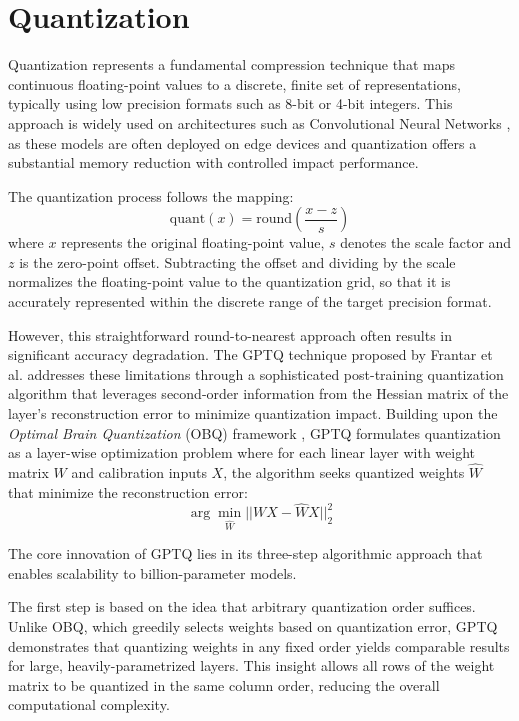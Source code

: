 \section{Quantization} \label{quantization}

Quantization represents a fundamental compression technique that maps continuous floating-point values to a discrete, finite set of representations, typically using low precision formats such as 8-bit or 4-bit integers. This approach is widely used on architectures such as Convolutional Neural Networks \cite{quant_cnn}, as these models are often deployed on edge devices and quantization offers a substantial memory reduction with controlled impact performance.

The quantization process follows the mapping:
\begin{equation}
\text{quant}(x) = \text{round}\left(\frac{x - z}{s}\right)
\end{equation}
where $x$ represents the original floating-point value, $s$ denotes the scale factor and $z$ is the zero-point offset. Subtracting the offset and dividing by the scale normalizes the floating-point value to the quantization grid, so that it is accurately represented within the discrete range of the target precision format.

However, this straightforward round-to-nearest approach often results in significant accuracy degradation. The GPTQ technique proposed by Frantar et al. \cite{gptq_quantization} addresses these limitations through a sophisticated post-training quantization algorithm that leverages second-order information from the Hessian matrix of the layer's reconstruction error to minimize quantization impact. Building upon the \textit{Optimal Brain Quantization} (OBQ) framework \cite{obq}, GPTQ formulates quantization as a layer-wise optimization problem where for each linear layer with weight matrix $W$ and calibration inputs $X$, the algorithm seeks quantized weights $\hat{W}$ that minimize the reconstruction error:
\begin{equation}
\arg\min_{\hat{W}} ||WX - \hat{W}X||_2^2
\end{equation}

The core innovation of GPTQ lies in its three-step algorithmic approach that enables scalability to billion-parameter models.

The first step is based on the idea that arbitrary quantization order suffices. Unlike OBQ, which greedily selects weights based on quantization error, GPTQ demonstrates that quantizing weights in any fixed order yields comparable results for large, heavily-parametrized layers. This insight allows all rows of the weight matrix to be quantized in the same column order, reducing the overall computational complexity.

